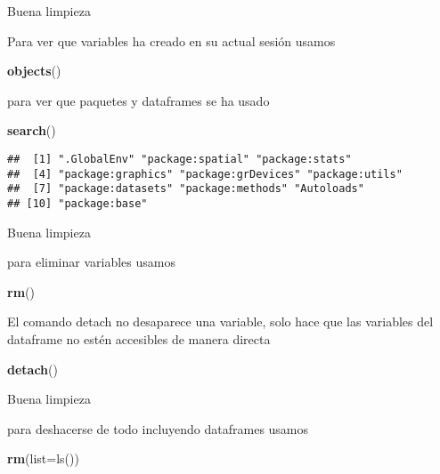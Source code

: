 \documentclass[ignorenonframetext,]{beamer}
\newenvironment{Shaded}{\begin{snugshade}}{\end{snugshade}}
\newcommand{\KeywordTok}[1]{\textcolor[rgb]{0.13,0.29,0.53}{\textbf{#1}}}
\newcommand{\StringTok}[1]{\textcolor[rgb]{0.31,0.60,0.02}{#1}}
\newcommand{\NormalTok}[1]{#1}
\begin{document}
\begin{frame}[fragile]{Buena limpieza}

Para ver que variables ha creado en su actual sesión usamos

\begin{Shaded}
\begin{Highlighting}[]
\KeywordTok{objects}\NormalTok{()}
\end{Highlighting}
\end{Shaded}

para ver que paquetes y dataframes se ha usado

\begin{Shaded}
\begin{Highlighting}[]
\KeywordTok{search}\NormalTok{()}
\end{Highlighting}
\end{Shaded}

\begin{verbatim}
##  [1] ".GlobalEnv" "package:spatial" "package:stats"    
##  [4] "package:graphics" "package:grDevices" "package:utils"    
##  [7] "package:datasets" "package:methods" "Autoloads"        
## [10] "package:base"
\end{verbatim}

\end{frame}

\begin{frame}[fragile]{Buena limpieza}

para eliminar variables usamos

\begin{Shaded}
\begin{Highlighting}[]
\KeywordTok{rm}\NormalTok{()}
\end{Highlighting}
\end{Shaded}

El comando detach no desaparece una variable, solo hace que las
variables del dataframe no estén accesibles de manera directa

\begin{Shaded}
\begin{Highlighting}[]
\KeywordTok{detach}\NormalTok{()}
\end{Highlighting}
\end{Shaded}

\end{frame}

\begin{frame}[fragile]{Buena limpieza}

para deshacerse de todo incluyendo dataframes usamos

\begin{Shaded}
\begin{Highlighting}[]
\KeywordTok{rm}\NormalTok{(}\StringTok{list=ls()}\NormalTok{)}
\end{Highlighting}
\end{Shaded}

\end{frame}
\end{document}
